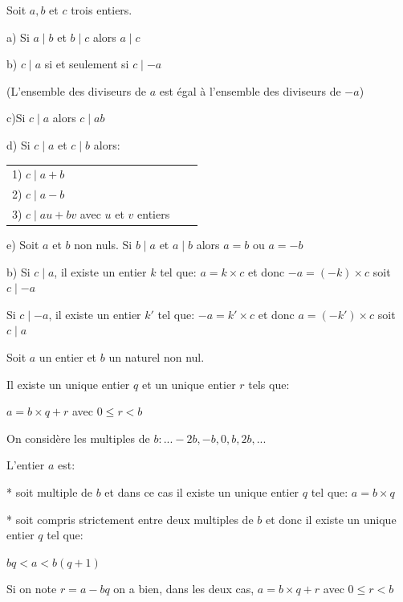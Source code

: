 \documentclass[french]{book}
\begin{document}
 \begin{prop} 
Soit $a, b$ et $c$ trois entiers.

a) Si $a\mid b$ et $b\mid c$ alors $a\mid c$

b) $c\mid a$ si et seulement si $c\mid -a$

{\small (L'ensemble des diviseurs de $a$ est égal à l'ensemble des diviseurs de $-a$)}



c)Si $c\mid a$ alors $c\mid ab$

d) Si $c\mid a$ et $c\mid b$ alors: \begin{tabular}[t]{lll}1) $c\mid a+b$\\2) $c\mid a-b$\\3) $c\mid au+bv$ avec $u$ et $v$ entiers
\end{tabular}

e) Soit $a$ et $b$ non nuls. Si $b\mid a$ et $a \mid b$ alors $a=b$ ou $a= -b$

\end{prop}

 \begin{demo}

b) Si $c\mid a$, il existe un entier $k$ tel que: $a=k \times c$ et donc $-a=\left( -k\right) \times c$ soit $c\mid-a$

Si $c\mid -a$, il existe un entier $k'$ tel que: $-a=k' \times c$ et donc $a=\left( -k'\right) \times c$ soit $c\mid a$

\end{demo}






\begin{thm}
Soit $a$ un entier et $b$ un naturel non nul.

Il existe un unique entier $q$ et un unique entier $r$ tels que:
\begin{center}
$a=b \times q+r$ avec $0\leq r < b$
\end{center}

\end{thm}

\begin{demo}
On considère les multiples de $b: ...-2b, -b, 0, b, 2b, ...$

L'entier $a$ est:

* soit multiple de $b$ et dans ce cas il existe un unique entier $q$ tel que: $a=b \times q$

* soit compris strictement entre deux multiples de $b$ et donc il existe un unique entier $q$ tel que:

\hspace{3cm}$bq < a < b\left( q+1\right) $

Si on note $r=a-bq$ on a bien, dans les deux cas, $a=b \times q+r$ avec $0\leq r < b$

\end{demo}
\end{document}

